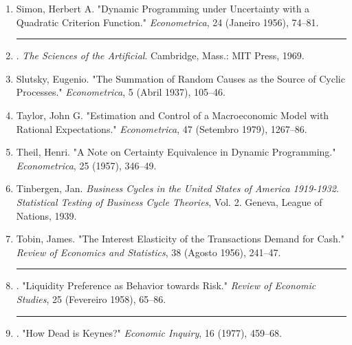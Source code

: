 \documentclass[12pt]{article}
\begin{document}
\begin{enumerate}
    \item Simon, Herbert A. "Dynamic Programming under Uncertainty with a Quadratic Criterion Function." \textit{Econometrica}, 24 (Janeiro 1956), 74--81.
    \item \rule{1cm}{0.4pt}. \textit{The Sciences of the Artificial}. Cambridge, Mass.: MIT Press, 1969.
    \item Slutsky, Eugenio. "The Summation of Random Causes as the Source of Cyclic Processes." \textit{Econometrica}, 5 (Abril 1937), 105--46.
    \item Taylor, John G. "Estimation and Control of a Macroeconomic Model with Rational Expectations." \textit{Econometrica}, 47 (Setembro 1979), 1267--86.
    \item Theil, Henri. "A Note on Certainty Equivalence in Dynamic Programming." \textit{Econometrica}, 25 (1957), 346--49.
    \item Tinbergen, Jan. \textit{Business Cycles in the United States of America 1919-1932. Statistical Testing of Business Cycle Theories}, Vol. 2. Geneva, League of Nations, 1939.
    \item Tobin, James. "The Interest Elasticity of the Transactions Demand for Cash." \textit{Review of Economics and Statistics}, 38 (Agosto 1956), 241--47.
    \item \rule{1cm}{0.4pt}. "Liquidity Preference as Behavior towards Risk." \textit{Review of Economic Studies}, 25 (Fevereiro 1958), 65--86.
    \item \rule{1cm}{0.4pt}. "How Dead is Keynes?" \textit{Economic Inquiry}, 16 (1977), 459--68.
\end{enumerate}
\end{document}

